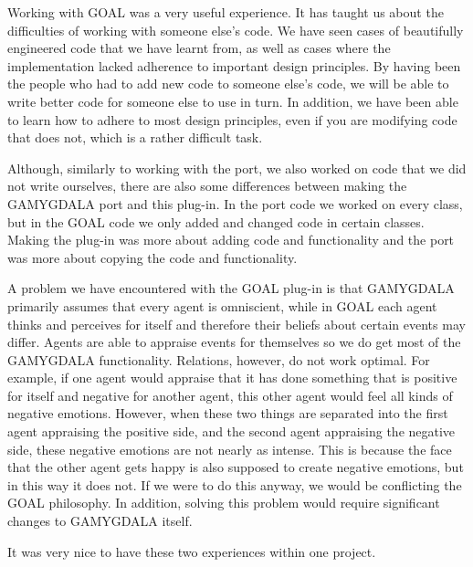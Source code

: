 Working with GOAL was a very useful experience. It has taught us about the difficulties of working with someone else's code. We have seen cases of beautifully engineered code that we have learnt from, as well as cases where the implementation lacked adherence to important design principles. By having been the people who had to add new code to someone else's code, we will be able to write better code for someone else to use in turn. In addition, we have been able to learn how to adhere to most design principles, even if you are modifying code that does not, which is a rather difficult task.

Although, similarly to working with the port, we also worked on code that we did not write ourselves, there are also some differences between making the GAMYGDALA port and this plug-in. In the port code we worked on every class, but in the GOAL code we only added and changed code in certain classes. Making the plug-in was more about adding code and functionality and the port was more about copying the code and functionality.

A problem we have encountered with the GOAL plug-in is that GAMYGDALA primarily assumes that every agent is omniscient, while in GOAL each agent thinks and perceives for itself and therefore their beliefs about certain events may differ. Agents are able to appraise events for themselves so we do get most of the GAMYGDALA functionality. Relations, however, do not work optimal. For example, if one agent would appraise that it has done something that is positive for itself and negative for another agent, this other agent would feel all kinds of negative emotions. However, when these two things are separated into the first agent appraising the positive side, and the second agent appraising the negative side, these negative emotions are not nearly as intense. This is because the face that the other agent gets happy is also supposed to create negative emotions, but in this way it does not. If we were to do this anyway, we would be conflicting the GOAL philosophy. In addition, solving this problem would require significant changes to GAMYGDALA itself.

It was very nice to have these two experiences within one project.


